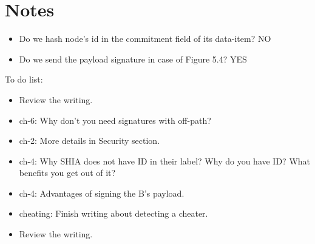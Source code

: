 \chapter{Notes}

\begin{itemize}
	\item Do we hash node's id in the commitment field of its data-item? NO
	\item Do we send the payload signature in case of Figure 5.4? YES
\end{itemize}

To do list:
\begin{itemize}
	\item Review the writing.
	\item ch-6: Why don't you need signatures with off-path?
	\item ch-2: More details in Security section.
	\item ch-4: Why SHIA does not have ID in their label? Why do you have ID? What benefits you get out of it?
	\item ch-4: Advantages of signing the B's payload.
	\item cheating: Finish writing about detecting a cheater.
	\item Review the writing.
	
\end{itemize}